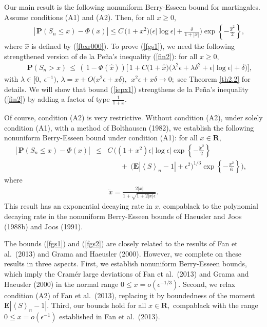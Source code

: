 \documentclass{gSTA2e}
\theoremstyle{plain}
\theoremstyle{definition}
\theoremstyle{remark}
\begin{document}
Our main result is the following  nonuniform Berry-Esseen bound for martingales.
Assume   conditions (A1) and (A2). Then, for all $x \geq 0$,
\begin{eqnarray}\label{fgs1}
 && \left|\frac{}{} \mathbf{P}(S_n \leq x )-  \Phi\left( x\right) \right|     \leq   C\,\Big( 1+ x^2 \Big)\Big( \epsilon|\log \epsilon| +\frac{\delta }{1 +|x| }\Big) \exp\left\{-\frac{\widehat{x}^2}{2}\right\} ,
\end{eqnarray}
where $\widehat{x}$ is defined by (\ref{fbxr000}).
To prove (\ref{fgs1}), we need the following strengthened version  of  de la Pe\~{n}a's inequality (\ref{fin2}):
for all $  x\geq 0 ,$
\begin{eqnarray}
  \ \ \ \ \ \ \ \ \mathbf{P}(S_n>x )  \, \leq \, \left( \frac{}{}1- \Phi\left( \widehat{x} \right)\right)
  \Big[\frac{}{} 1+ C \Big(1+ \widehat{x} \Big)  \Big(  \lambda ^2 \epsilon +  \lambda  \delta^2 + \epsilon \left| \log  \epsilon
 \right| +   \delta  \Big) \Big],\label{iepx1}
\end{eqnarray}
with $\lambda \in [0, \  \epsilon^{-1})$, $ \lambda  = x + O\big(x^2\epsilon+ x\delta \big) ,  \ \ x^2\epsilon+ x\delta \rightarrow 0;$
see Theorem \ref{th2.2} for details.  We will show that bound  (\ref{iepx1})
strengthens de la Pe\~{n}a's inequality (\ref{fin2}) by adding a factor of  type $\frac{1}{1+ x}$.


Of course, condition (A2) is very restrictive.
Without condition (A2), under solely condition (A1), with a method of Bolthausen (1982), we establish the following
nonuniform Berry-Esseen bound under condition  (A1): for all $x \in \mathbf{R},$
\begin{eqnarray}
\left|\frac{}{} \mathbf{P}(S_n \leq x )-  \Phi\left( x\right) \right|
  &\leq&   C \, \bigg( \left(  1+ x^2 \right)\epsilon|\log \epsilon| \exp\left\{-\frac{ \breve{x} ^2}{2}\right\}  \nonumber \\
  & & \ \ \ \ \ \ \ \ + \ \Big(\mathbf{E}|\! \left\langle S\right\rangle_n -1| + \epsilon^2 \Big)^{1/3}  \exp\left\{-\frac{x^2}{6}\right\} \bigg),\ \ \
\label{fgs2}
\end{eqnarray}
where
\begin{eqnarray}\label{tgn35}
\breve{x}  = \frac{2|x| }{1+\sqrt{1+2|x|\epsilon }}.
\end{eqnarray}
This result has an exponential decaying rate in $x$, compablack to the polynomial decaying rate in the nonuniform
Berry-Esseen bounds of Haeusler and Joos (1988b) and  Joos (1991). 


The bounds (\ref{fgs1}) and (\ref{fgs2}) are closely related to the results of Fan et al.\ (2013) and Grama and  Haeusler (2000).   However,  we complete on these results in three aspects.
First, we establish nonuniform Berry-Esseen bounds, which imply the Cram\'{e}r large deviations of    Fan et al.\ (2013) and Grama and  Haeusler (2000) in the normal range $0\leq x =o(\epsilon^{-1/3})$.
Second, we relax condition (A2) of Fan et al.\ (2013), replacing it by boundedness of the moment $\mathbf{E}|\! \left\langle S\right\rangle_n -1|$.
Third, our bounds hold  for all $x \in \mathbf{R},$ compablack with the range $0\leq x =o(\epsilon^{-1})$ established in Fan et al.\ (2013).
\end{document}
